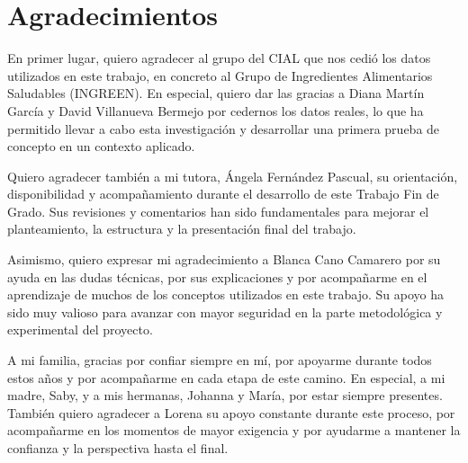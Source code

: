 

\chapter*{Agradecimientos}


En primer lugar, quiero agradecer al grupo del CIAL que nos cedió los datos utilizados en este trabajo, en concreto al Grupo de Ingredientes Alimentarios Saludables (INGREEN). En especial, quiero dar las gracias a Diana Martín García y David Villanueva Bermejo por cedernos los datos reales, lo que ha permitido llevar a cabo esta investigación y desarrollar una primera prueba de concepto en un contexto aplicado.

Quiero agradecer también a mi tutora, Ángela Fernández Pascual, su orientación, disponibilidad y acompañamiento durante el desarrollo de este Trabajo Fin de Grado. Sus revisiones y comentarios han sido fundamentales para mejorar el planteamiento, la estructura y la presentación final del trabajo.

Asimismo, quiero expresar mi agradecimiento a Blanca Cano Camarero por su ayuda en las dudas técnicas, por sus explicaciones y por acompañarme en el aprendizaje de muchos de los conceptos utilizados en este trabajo. Su apoyo ha sido muy valioso para avanzar con mayor seguridad en la parte metodológica y experimental del proyecto.

A mi familia, gracias por confiar siempre en mí, por apoyarme durante todos estos años y por acompañarme en cada etapa de este camino. En especial, a mi madre, Saby, y a mis hermanas, Johanna y María, por estar siempre presentes. También quiero agradecer a Lorena su apoyo constante durante este proceso, por acompañarme en los momentos de mayor exigencia y por ayudarme a mantener la confianza y la perspectiva hasta el final.
